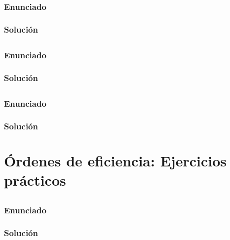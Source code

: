 \subsubsection{Enunciado}

\subsubsection{Solución}

\subsection{}\label{ej1-1-5}

\subsubsection{Enunciado}

\subsubsection{Solución}

\subsection{}\label{ej1-1-6}

\subsubsection{Enunciado}

\subsubsection{Solución}

\section{Órdenes de eficiencia: Ejercicios prácticos}

\subsection{}\label{ej1-1-7}

\subsubsection{Enunciado}

\subsubsection{Solución}

